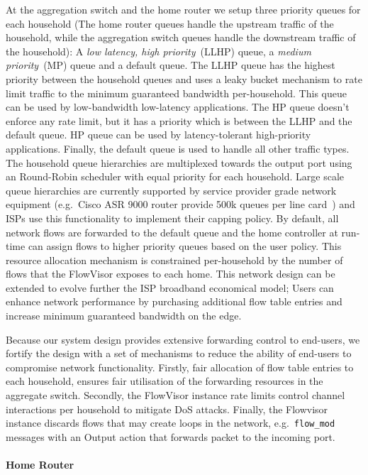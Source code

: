 At the aggregation switch and the home router we setup three priority queues for
each household (The home router queues handle the upstream traffic of the
household, while the aggregation switch queues handle the downstream traffic of
the household): A {\it low latency, high priority}~(LLHP) queue, a {\it medium
  priority}~(MP) queue and a default queue.  The LLHP queue has the highest
priority between the household queues and uses a leaky bucket mechanism to rate
limit traffic to the minimum guaranteed bandwidth per-household. This queue can
be used by low-bandwidth low-latency applications. The HP queue doesn't enforce
any rate limit, but it has a priority which is between the LLHP and the default
queue.  HP queue can be used by latency-tolerant high-priority applications.
Finally, the default queue is used to handle all other traffic types.  The
household queue
hierarchies are multiplexed towards the output port using an Round-Robin
scheduler with 
equal priority for each household.  Large scale queue hierarchies are currently supported by
service provider grade network equipment (e.g.~Cisco ASR 9000 router provide
500k queues per line card~\cite{cisco-asr-qos}) and ISPs use this functionality
to implement their capping policy. By default, all network flows are forwarded
to the default queue and the home \of controller at run-time can assign flows to
higher priority queues based on the user policy.  This resource
allocation mechanism is constrained per-household by the number of flows that the
FlowVisor exposes to each home.  This network design can be extended to evolve
further the ISP broadband economical model; Users can enhance network
performance by purchasing additional flow table entries and increase minimum
guaranteed bandwidth on the edge. 

Because our system design provides extensive forwarding control to end-users, we
fortify the design with a set of mechanisms to reduce the ability of end-users
to compromise network functionality.  Firstly, fair allocation of flow table
entries to each household, ensures fair utilisation of the forwarding resources
in the aggregate switch. Secondly, the FlowVisor instance rate limits \of
control channel interactions per household to mitigate DoS attacks. Finally, the
Flowvisor instance discards flows that may create loops in the network,
e.g.~{\tt flow\_mod} messages with an Output action  that forwards packet to the
incoming port. 

\paragraph*{Home Router}

